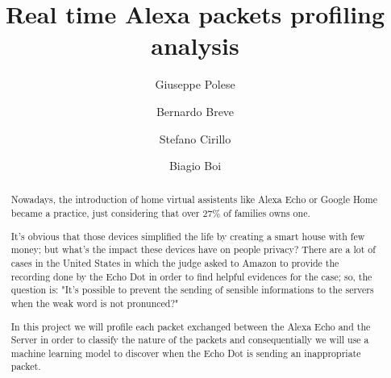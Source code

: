 \documentclass[sigconf]{acmart}
\begin{document}
\title{Real time Alexa packets profiling analysis}


\author{Giuseppe Polese}

\author{Bernardo Breve}
\author{Stefano Cirillo}

\author{Biagio Boi}

\begin{abstract}
Nowadays, the introduction of home virtual assistents like Alexa Echo or Google Home became a practice, just considering that over 27\% of families owns one.

It's obvious that those devices simplified the life by creating a smart house with few money; but what's the impact these devices have on people privacy?
There are a lot of cases in the United States in which the judge asked to Amazon to provide the recording done by the Echo Dot in order to find helpful
evidences for the case; so, the question is: "It's possible to prevent the sending of sensible informations to the servers when the weak word is not pronunced?"

In this project we will profile each packet exchanged between the Alexa Echo and the Server in order to classify the nature of the packets and consequentially we will use a machine learning model to discover when the Echo Dot is sending an inappropriate packet.
\end{abstract}

\end{document}
